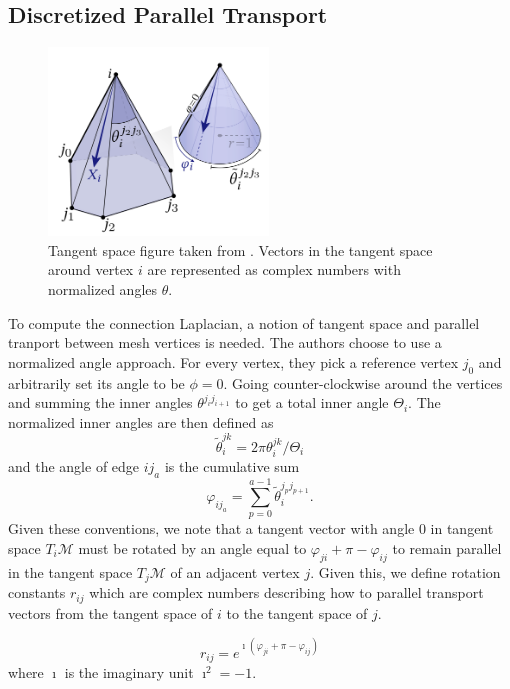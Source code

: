 \documentclass{article}
\begin{document}
\subsection{Discretized Parallel Transport}
\begin{figure}[H]\label{fig:tangentspace}
  \centering
  \includegraphics[height=5cm]{figures/tangentspace.png}
  \caption{Tangent space figure taken from \cite{Sharp:2019:VHM}. Vectors in
    the tangent space around vertex $i$ are represented as complex numbers with
    normalized angles $\theta$.}
\end{figure}
To compute the connection Laplacian, a notion of tangent space and parallel
tranport between mesh vertices is needed. The authors choose to use a normalized
angle approach. For every vertex, they pick a reference vertex $j_{0}$ and
arbitrarily set its angle to be $\phi = 0$. Going counter-clockwise around the
vertices and summing the inner angles $\theta^{j_{i}j_{{i+1}}}$ to get a total
inner angle $\Theta_{i}$. The normalized inner angles are then defined as
\begin{equation}\label{eqn:normangles}
  \tilde\theta_{i}^{jk} = 2\pi\theta_{i}^{{jk}}/\Theta_{i}
\end{equation}
and the angle of edge $ij_{a}$ is the cumulative sum
\begin{equation}\label{eqn:totalangles}
  \varphi_{ij_{a}} = \sum_{p=0}^{a-1}\tilde\theta_{i}^{j_{p}j_{p+1}}.
\end{equation}
Given these conventions, we note that a tangent vector with angle $0$ in
tangent space $T_{i}\mathcal{M}$ must be rotated by an angle equal to
$\varphi_{ji} + \pi - \varphi_{ij}$ to remain parallel in the tangent space
$T_{j}\mathcal{M}$ of an adjacent vertex $j$. Given this, we define rotation
constants $r_{ij}$ which are complex numbers describing how to parallel
transport vectors from the tangent space of $i$ to the tangent space of $j$.

\begin{equation}\label{rij}
  r_{ij} = e^{\imath(\varphi_{ji} + \pi - \varphi_{ij})}
\end{equation}
where $\imath$ is the imaginary unit $\imath^{2} = -1$.
\end{document}
